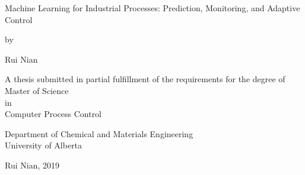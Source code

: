 \documentclass[12pt]{report}
\begin{document}
\begin{titlepage}
    \begin{center}
    
        \vspace*{1.1cm}
        
        \LARGE
        Machine Learning for Industrial Processes: Prediction, Monitoring, and Adaptive Control \\
        
        \vspace{1cm}
        
        \normalsize by \\
        
        \vspace{1cm}
        
        \large Rui Nian \\
        
        \vspace{3cm}
        
        {\normalsize
        A thesis submitted in partial fulfillment of the requirements for the degree of \\
        \vspace{1cm}}
        Master of Science \\
        {\normalsize in} \\ 
        Computer Process Control \\
        
        \vspace{3cm}
        
        {\normalsize
        Department of Chemical and Materials Engineering \\
        University of Alberta \\}
        
        \vspace{1cm}
        
        {\normalsize
        \textcopyright \hspace{1mm} Rui Nian, 2019 \\}
        

    \end{center}
\end{titlepage}



\setcounter{page}{2}
\end{document}
